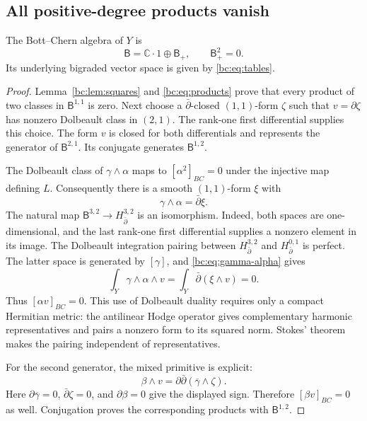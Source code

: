 \subsection{All positive-degree products vanish}

\begin{theorem}\label{bc:thm:ring}
The Bott--Chern algebra of $Y$ is
\begin{equation}\label{bc:eq:ring}
             \mathsf B=\mathbb C\cdot1\oplus\mathsf B_+,
             \qquad \mathsf B_+^2=0.
\end{equation}
Its underlying bigraded vector space is given by
\eqref{bc:eq:tables}.
\end{theorem}

\begin{proof}
Lemma~\ref{bc:lem:squares} and \eqref{bc:eq:products} prove
that every product of two classes in $\mathsf B^{1,1}$ is zero.
Next choose a $\bar\partial$-closed $(1,1)$-form $\zeta$ such
that $v=\partial\zeta$ has nonzero Dolbeault class in $(2,1)$.
The rank-one first differential supplies this choice.
The form $v$ is closed for both differentials and represents
the generator of $\mathsf B^{2,1}$.
Its conjugate generates $\mathsf B^{1,2}$.

The Dolbeault class of $\gamma\wedge\alpha$ maps to
$[\alpha^2]_{BC}=0$ under the injective map defining $L$.
Consequently there is a smooth $(1,1)$-form $\xi$ with
\begin{equation}\label{bc:eq:gamma-alpha}
                   \gamma\wedge\alpha=\bar\partial\xi.
\end{equation}
The natural map
$\mathsf B^{3,2}\to H_{\bar\partial}^{3,2}$ is an isomorphism.
Indeed, both spaces are one-dimensional, and the last rank-one
first differential supplies a nonzero element in its image.
The Dolbeault integration pairing between
$H_{\bar\partial}^{3,2}$ and $H_{\bar\partial}^{0,1}$ is perfect.
The latter space is generated by $[\gamma]$, and
\eqref{bc:eq:gamma-alpha} gives
\[
 \int_Y\gamma\wedge\alpha\wedge v
      =\int_Y\bar\partial(\xi\wedge v)=0.
\]
Thus $[\alpha v]_{BC}=0$.
This use of Dolbeault duality requires only a compact Hermitian
metric: the antilinear Hodge operator gives complementary
harmonic representatives and pairs a nonzero form to its squared
norm. Stokes' theorem makes the pairing independent of representatives.

For the second generator, the mixed primitive is explicit:
\begin{equation}\label{bc:eq:mixed-degree-three}
         \beta\wedge v
             =\partial\bar\partial(\overline\gamma\wedge\zeta).
\end{equation}
Here $\partial\overline\gamma=0$, $\bar\partial\zeta=0$,
and $\partial\beta=0$ give the displayed sign.
Therefore $[\beta v]_{BC}=0$ as well.
Conjugation proves the corresponding products with
$\mathsf B^{1,2}$.


\end{proof}
